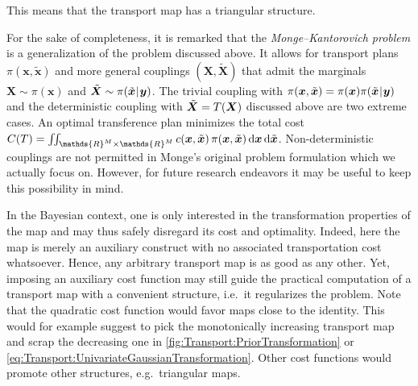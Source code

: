 This means that the transport map has a triangular structure.
\par %
For the sake of completeness, it is remarked that the \emph{Monge--Kantorovich problem} is a generalization of the problem discussed above.
It allows for transport plans \(\pi(\bm{x},\tilde{\bm{x}})\) and more general couplings \((\bm{X},\tilde{\bm{X}})\)
that admit the marginals \(\bm{X} \sim \pi(\bm{x})\) and \(\tilde{\bm{X}} \sim \pi(\tilde{\bm{x}} {\:\!}|{\:\!} \bm{y})\).
The trivial coupling with \(\pi(\bm{x},\tilde{\bm{x}}) = \pi(\bm{x}) \pi(\tilde{\bm{x}} {\:\!}|{\:\!} \bm{y})\)
and the deterministic coupling with \(\tilde{\bm{X}} = T(\bm{X})\) discussed above are two extreme cases.
An optimal transference plan minimizes the total cost
\(C(\map) = \iint_{\mathds{R}^{\dimParam} \times \mathds{R}^{\dimParam}} c(\bm{x},\tilde{\bm{x}}) \, \pi(\bm{x},\tilde{\bm{x}}) \, \mathrm{d} \bm{x} \, \mathrm{d} \tilde{\bm{x}}\).
Non-deterministic couplings are not permitted in Monge's original problem formulation which we actually focus on.
However, for future research endeavors it may be useful to keep this possibility in mind.
\par %
In the Bayesian context, one is only interested in the transformation properties of the map and may thus safely disregard its cost and optimality.
Indeed, here the map is merely an auxiliary construct with no associated transportation cost whatsoever.
Hence, any arbitrary transport map is as good as any other.
Yet, imposing an auxiliary cost function may still guide the practical computation of a transport map with a convenient structure, i.e.\ it regularizes the problem.
Note that the quadratic cost function would favor maps close to the identity.
This would for example suggest to pick the monotonically increasing transport map and scrap the decreasing one
in \cref{fig:Transport:PriorTransformation} or \cref{eq:Transport:UnivariateGaussianTransformation}.
Other cost functions would promote other structures, e.g.\ triangular maps.